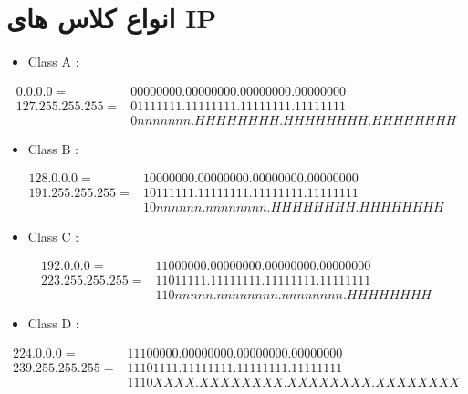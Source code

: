 \documentclass{article}
\begin{document}
\section{انواع کلاس های IP}

\begin{latin}
\begin{itemize}
	\item Class A :
\end{itemize}
\end{latin}
\begin{align*}
 0.  0.  0.  0 = &00000000.00000000.00000000.00000000 \\
127.255.255.255 = &01111111.11111111.11111111.11111111 \\
                  &0nnnnnnn.HHHHHHHH.HHHHHHHH.HHHHHHHH
\end{align*}


\begin{latin}
\begin{itemize}
	\item Class B :
\end{itemize}
\end{latin}
\begin{align*}
128.  0.  0.  0 = &10000000.00000000.00000000.00000000 \\
191.255.255.255 = &10111111.11111111.11111111.11111111 \\
                  &10nnnnnn.nnnnnnnn.HHHHHHHH.HHHHHHHH
\end{align*}


\begin{latin}
\begin{itemize}
	\item Class C :
\end{itemize}
\end{latin}
\begin{align*}
192.  0.  0.  0 = &11000000.00000000.00000000.00000000 \\
223.255.255.255 = &11011111.11111111.11111111.11111111 \\
                  &110nnnnn.nnnnnnnn.nnnnnnnn.HHHHHHHH
\end{align*}



\begin{latin}
\begin{itemize}
	\item Class D :
\end{itemize}
\end{latin}
\begin{align*}
224.  0.  0.  0 = &11100000.00000000.00000000.00000000 \\
239.255.255.255 = &11101111.11111111.11111111.11111111 \\
                  &1110XXXX.XXXXXXXX.XXXXXXXX.XXXXXXXX
\end{align*}
\end{document}
